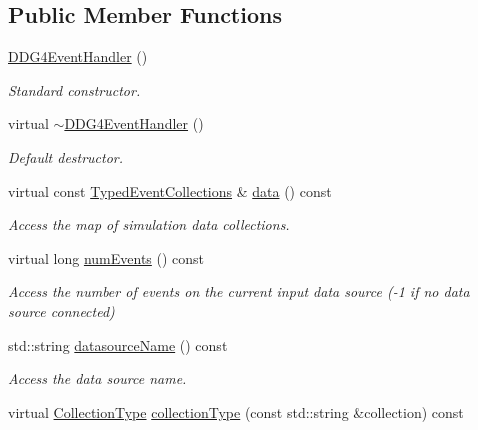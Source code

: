 \subsection*{Public Member Functions}
\begin{DoxyCompactItemize}
\item 
\hyperlink{class_d_d4hep_1_1_d_d_g4_event_handler_af3bf78e2d9ae9789b6e9a0ff8c332a07}{D\+D\+G4\+Event\+Handler} ()
\begin{DoxyCompactList}\small\item\em Standard constructor. \end{DoxyCompactList}\item 
virtual \hyperlink{class_d_d4hep_1_1_d_d_g4_event_handler_a149942eb56e028c4f5ea9f814e6dbd3b}{$\sim$\+D\+D\+G4\+Event\+Handler} ()
\begin{DoxyCompactList}\small\item\em Default destructor. \end{DoxyCompactList}\item 
virtual const \hyperlink{class_d_d4hep_1_1_event_handler_a4d441ff8a824b1e2f278e8b7a6391af3}{Typed\+Event\+Collections} \& \hyperlink{class_d_d4hep_1_1_d_d_g4_event_handler_aca1f9d6fca9322b89815c68529fac540}{data} () const
\begin{DoxyCompactList}\small\item\em Access the map of simulation data collections. \end{DoxyCompactList}\item 
virtual long \hyperlink{class_d_d4hep_1_1_d_d_g4_event_handler_af8ae7a5a68752fa17aa83ab9f0a952fe}{num\+Events} () const
\begin{DoxyCompactList}\small\item\em Access the number of events on the current input data source (-\/1 if no data source connected) \end{DoxyCompactList}\item 
std\+::string \hyperlink{class_d_d4hep_1_1_d_d_g4_event_handler_a8447b4fc24290d4f1539fbda65a0cbf3}{datasource\+Name} () const
\begin{DoxyCompactList}\small\item\em Access the data source name. \end{DoxyCompactList}\item 
virtual \hyperlink{class_d_d4hep_1_1_event_handler_a0b22a141a019364495835317fad48254}{Collection\+Type} \hyperlink{class_d_d4hep_1_1_d_d_g4_event_handler_acc51cf7d3b3b338c6f5ae1f75582f708}{collection\+Type} (const std\+::string \&collection) const

\end{DoxyCompactItemize}
